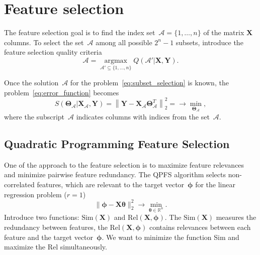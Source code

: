 \documentclass[12pt,twoside]{article}
\newcommand{\bY}{\mathbf{Y}}
\newcommand{\bX}{\mathbf{X}}
\newcommand{\bbR}{\mathbb{R}}
\newcommand{\cA}{\mathcal{A}}
\newcommand{\bphi}{\boldsymbol{\phi}}
\newcommand{\btheta}{\boldsymbol{\theta}}
\newcommand{\bTheta}{\boldsymbol{\Theta}}
\newcommand{\argmax}{\mathop{\arg \max}\limits}
\begin{document}
 \section{Feature selection}
 The feature selection goal is to find the index set~$\cA = \{1, \dots, n\}$ of the matrix $\bX$ columns. To select the set~$\cA$ among all possible $2^n - 1$ subsets, introduce the feature selection quality criteria
\begin{equation}
	\cA = \argmax_{\cA' \subseteq \{1, \dots, n\}} Q(\cA' | \bX, \bY).
	\label{eq:subset_selection}
\end{equation}

Once the solution~$\cA$ for the problem~\eqref{eq:subset_selection} is known, the problem~\eqref{eq:error_function} becomes
\begin{equation}
S(\bTheta_{\cA} | \bX_{\cA}, \bY) = {\left\| \mathbf{Y} - \bX_{\cA}\bTheta^T_{\cA} \right\| }_2^2 = \rightarrow\min_{\bTheta_{\cA}},
\end{equation}
where the subscript~$\cA$ indicates columns with indices from the set~$\cA$.

\subsection{Quadratic Programming Feature Selection}
One of the approach to the feature selection is to maximize feature relevances and minimize pairwise feature redundancy.
The QPFS algorithm selects non-correlated features, which are relevant to the target vector~$\bphi$ for the linear regression problem ($r=1$)
\begin{equation*}
	\| \bphi - \bX \btheta\|_2^2 \rightarrow\min_{\btheta \in \bbR^{n}}.
\end{equation*}
Introduce two functions: $\text{Sim}(\bX)$ and $\text{Rel}(\bX, \bphi)$. 
The $\text{Sim}(\bX)$ measures the redundancy between features, the $\text{Rel}(\bX, \bphi)$ contains relevances between each feature and the target vector~$\bphi$. 
We want to minimize the function Sim and maximize the Rel simultaneously.
\end{document}
